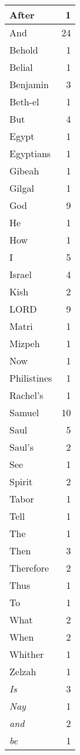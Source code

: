 \begin{center}
\begin{longtable}{l|r}
\hline \hline
\endlastfoot
After & 1 \\ \hline
And & 24 \\ \hline
Behold & 1 \\ \hline
Belial & 1 \\ \hline
Benjamin & 3 \\ \hline
Beth-el & 1 \\ \hline
But & 4 \\ \hline
Egypt & 1 \\ \hline
Egyptians & 1 \\ \hline
Gibeah & 1 \\ \hline
Gilgal & 1 \\ \hline
God & 9 \\ \hline
He & 1 \\ \hline
How & 1 \\ \hline
I & 5 \\ \hline
Israel & 4 \\ \hline
Kish & 2 \\ \hline
LORD & 9 \\ \hline
Matri & 1 \\ \hline
Mizpeh & 1 \\ \hline
Now & 1 \\ \hline
Philistines & 1 \\ \hline
Rachel's & 1 \\ \hline
Samuel & 10 \\ \hline
Saul & 5 \\ \hline
Saul's & 2 \\ \hline
See & 1 \\ \hline
Spirit & 2 \\ \hline
Tabor & 1 \\ \hline
Tell & 1 \\ \hline
The & 1 \\ \hline
Then & 3 \\ \hline
Therefore & 2 \\ \hline
Thus & 1 \\ \hline
To & 1 \\ \hline
What & 2 \\ \hline
When & 2 \\ \hline
Whither & 1 \\ \hline
Zelzah & 1 \\ \hline
\emph{Is} & 3 \\ \hline
\emph{Nay} & 1 \\ \hline
\emph{and} & 2 \\ \hline
\emph{be} & 1 \\ \hline

\end{longtable}
\end{center}
